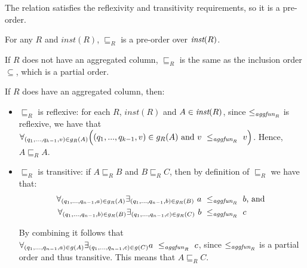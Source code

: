 The relation satisfies the reflexivity and transitivity requirements, so it is a pre-order.

\begin{lem}\label{lem:preorder}
For any $R$ and $inst(R)$, $\sqsubseteq_R$ is a pre-order over $\textit{inst}(R)$.
\end{lem}
\begin{prof}
If $R$ does not have an aggregated column, $\sqsubseteq_R$ is the same as the inclusion order $\subseteq$, which is a partial order.

If $R$ does have an aggregated column, then:

\begin{itemize}
\item $\sqsubseteq_R$ is reflexive: for each $R$, $inst(R)$ and $A \in \textit{inst}(R)$, since $\le_{\textit{aggfun}_R}$ is reflexive, we have that $\forall_{(q_1, ..., q_{k-1}, v) \in g_R(A)} \Big( (q_1, ..., q_{k-1}, v) \in g_R(A)~\text{and}~v~\le_{\textit{aggfun}_R}~v \Big)$. Hence, $A \sqsubseteq_R A$.
\item $\sqsubseteq_R$ is transitive: if $A \sqsubseteq_R B$ and $B \sqsubseteq_R  C$, then by definition of $\sqsubseteq_R$ we have that:
\begin{align*}
\forall_{(q_1, ..., q_{n-1}, a) \in g_R(A)} \exists_{(q_1, ..., q_{n-1}, b) \in g_R(B)}~a~\le_{\textit{aggfun}_R}~b &\text{, and } \\
\forall_{(q_1, ..., q_{n-1}, b) \in g_R(B)} \exists_{(q_1, ..., q_{n-1}, c) \in g_R(C)}~b~\le_{\textit{aggfun}_R}~c&
\end{align*}

By combining it follows that $\forall_{(q_1, ..., q_{n-1}, a) \in g(A)} \exists_{(q_1, ..., q_{n-1}, c) \in g(C)} a~\le_{\textit{aggfun}_R}~c $, since $\le_{\textit{aggfun}_R}$ is a partial order and thus transitive. This means that $A \sqsubseteq_R C$.
\end{itemize}

\end{prof}

